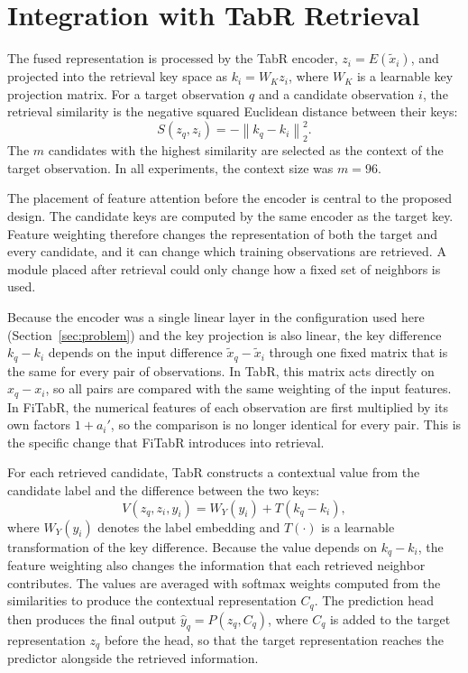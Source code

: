 \documentclass[11pt,a4paper,oneside, openany, reqno, chapter, nokorean]{oblivoir}
\theoremstyle{definition}
\theoremstyle{remark}
\numberwithin{equation}{chapter}
\theoremstyle{definition}
\theoremstyle{remark}
\theoremstyle{definition}
\begin{document}
\section{Integration with TabR Retrieval}
\label{sec:integration}

The fused representation is processed by the TabR encoder,
$z_i=E(\tilde{x}_i)$, and projected into the retrieval key space as $k_i=W_K
z_i$, where $W_K$ is a learnable key projection matrix. For a target
observation $q$ and a candidate observation $i$, the retrieval similarity is
the negative squared Euclidean distance between their keys:
\begin{equation}
S(z_q, z_i)
=
-
\left\|k_q - k_i\right\|_2^2.
\label{eq:retrieval_similarity}
\end{equation}
The $m$ candidates with the highest similarity are selected as the context of
the target observation. In all experiments, the context size was $m=96$.

The placement of feature attention before the encoder is central to the
proposed design. The candidate keys are computed by the same encoder as the
target key. Feature weighting therefore changes the representation of both the
target and every candidate, and it can change which training observations are
retrieved. A module placed after retrieval could only change how a fixed set
of neighbors is used.

Because the encoder was a single linear layer in the configuration used here
(Section~\ref{sec:problem}) and the key projection is also linear, the key
difference $k_q-k_i$ depends on the input difference $\tilde{x}_q-\tilde{x}_i$
through one fixed matrix that is the same for every pair of observations. In
TabR, this matrix acts directly on $x_q-x_i$, so all pairs are compared with
the same weighting of the input features. In FiTabR, the numerical features of
each observation are first multiplied by its own factors $1+a_i'$, so the
comparison is no longer identical for every pair. This is the specific change
that FiTabR introduces into retrieval.

For each retrieved candidate, TabR constructs a contextual value from the
candidate label and the difference between the two keys:
\begin{equation}
V(z_q, z_i, y_i)
=
W_Y(y_i) + T(k_q - k_i),
\label{eq:contextual_value}
\end{equation}
where $W_Y(y_i)$ denotes the label embedding and $T(\cdot)$ is a learnable
transformation of the key difference. Because the value depends on $k_q-k_i$,
the feature weighting also changes the information that each retrieved
neighbor contributes. The values are averaged with softmax weights computed
from the similarities to produce the contextual representation $C_q$. The
prediction head then produces the final output $\hat{y}_q = P(z_q, C_q)$,
where $C_q$ is added to the target representation $z_q$ before the head, so
that the target representation reaches the predictor alongside the retrieved
information.
\end{document}

